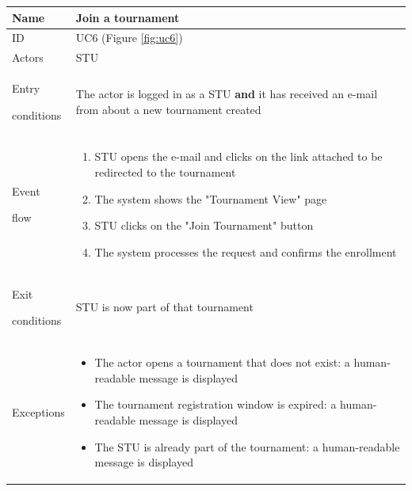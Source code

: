 \begin{center}
    \def\arraystretch{1.5}
    \begin{tabular}{| m{2cm} | m{10cm}|}
        \hline
        Name                  & Join a tournament                                                                                                       \\ \hline
        ID                    & UC6 (Figure \ref{fig:uc6})                                                                                              \\ \hline
        Actors                & STU                                                                                                                     \\ \hline
        Entry \par conditions & The actor is logged in as a STU \textbf{and} it has received an e-mail from about a new tournament created              \\ \hline
        Event \par flow       & \begin{enumerate}
                                    \item STU opens the e-mail and clicks on the link attached to be redirected to the tournament
                                    \item The system shows the "Tournament View" page
                                    \item STU clicks on the "Join Tournament" button
                                    \item The system processes the request and confirms the enrollment 
                                \end{enumerate}                                                                                                         \\ \hline
        Exit \par conditions  & STU is now part of that tournament                                                                                      \\ \hline
        Exceptions            & \begin{itemize}
                                    \item The actor opens a tournament that does not exist: a human-readable message is displayed
                                    \item The tournament registration window is expired: a human-readable message is displayed
                                    \item The STU is already part of the tournament: a human-readable message is displayed 
                                \end{itemize}                                                                                                           \\ \hline
    \end{tabular}
\end{center}

